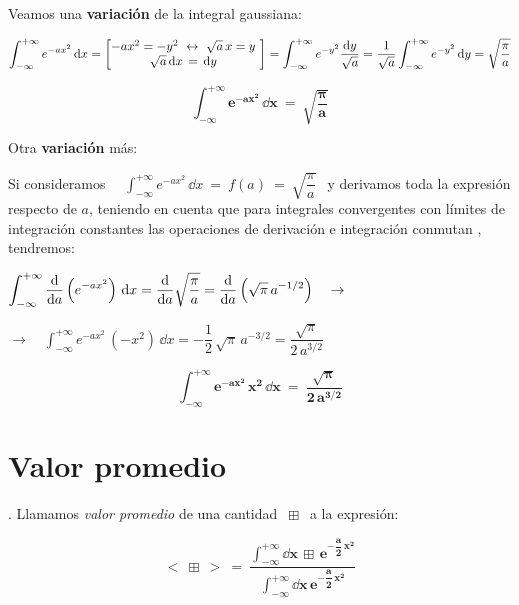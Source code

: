 \vspace{5mm} Veamos una \textbf{variación} de la integral gaussiana:

$\displaystyle \int_{-\infty}^{+\infty} e^{-ax^2}\, \dd x =  \mqty[-ax^2=-y^2 \ \leftrightarrow \ \sqrt{a}	\, x= y  \ \\ \sqrt{a} \, \dd x \, = \,  \dd y\ ]=  \int_{-\infty}^{+\infty} e^{-y^2} \dfrac{\dd y}{\sqrt{a}}=\dfrac 1{\sqrt{
a}}  \int_{-\infty}^{+\infty} e^{-y^2} \, \dd y = \sqrt{\dfrac \pi a}$ 




\begin{equation}
\label{ApendicesIntegralGaussiana2}
\boldsymbol{
	\boxed{ \  \int_{-\infty}^{+\infty} e^{-ax^2}\, \dd x \ =   \ \sqrt{\dfrac \pi a} \ }
}
\end{equation}

Otra \textbf{variación} más:


Si consideramos $\quad \displaystyle \int_{-\infty}^{+\infty} e^{-ax^2}\, \dd x \ = \ f(a) \ = \ \sqrt{\dfrac \pi a} \ \ $ y derivamos toda la expresión respecto de $a$, teniendo en cuenta que para integrales convergentes con límites de integración constantes las operaciones de derivación e integración conmutan , tendremos:

$\displaystyle \int_{-\infty}^{+\infty} \dv{a} \left(  e^{-ax^2} \right)\, \dd x = \dv{a} \sqrt{\dfrac \pi a }=\dv{a} \left( \sqrt{\pi} \, a^{-1/2} \right) \quad \to \quad  $

$ \to \quad \displaystyle \int_{-\infty}^{+\infty} e^{-ax^2}\, (-x^2) \, \dd x   = -  \dfrac 1 2  \, \sqrt{\pi} \, a^{-3/2}= \dfrac{\sqrt{\pi}}{2\, a^{3/2}}$


\begin{equation}
\label{ApendicesIntegralGaussiana3}
\boldsymbol{
	\boxed{ \   \int_{-\infty}^{+\infty} e^{-ax^2}\, x^2 \, \dd x  \ = \ \dfrac{\sqrt{\pi}}{2\, a^{3/2}} \ }
}
\end{equation}


\section{Valor promedio}

\begin{definition}
\vspace{2mm}
. Llamamos \emph{valor promedio} de una cantidad $\ \boxplus \ $ a la expresión:

\vspace{5mm}
\begin{equation}
\label{ApendicesValorPromedio}
\boldsymbol{
< \ \boxplus \ > \ = \ \dfrac { \displaystyle \int_{-\infty}^{+\infty} \dd x \, \boxplus \, e^{-\dfrac a 2 \, x^2} } { \displaystyle \int_{-\infty}^{+\infty} \dd x \, e^{-\dfrac a 2 \, x^2} }
}	
\end{equation}
\vspace{2mm}	
\end{definition}

